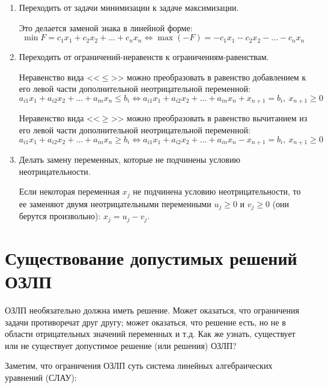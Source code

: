 \documentclass[a4paper,12pt]{report}
\begin{document}
\begin{enumerate}
\item Переходить от задачи минимизации к задаче максимизации. 

Это делается заменой знака в линейной форме:
\begin{equation*}
\min F = c_{1}x_{1} + c_{2}x_{2} + \ldots + c_{n}x_{n} \Leftrightarrow \max (-F) = -c_{1}x_{1} - c_{2}x_{2} - \ldots - c_{n}x_{n}
\end{equation*}

\item Переходить от ограничений-неравенств к ограничениям-равенствам. 

Неравенство вида <<$\leq$>> можно преобразовать в равенство добавлением к его левой части дополнительной неотрицательной переменной:
\begin{equation*}
a_{i1}x_{1} + a_{i2}x_{2} + \ldots + a_{in}x_{n} \leq b_{i} \Leftrightarrow a_{i1}x_{1} + a_{i2}x_{2} + \ldots + a_{in}x_{n} + x_{n+1} = b_{i},\ x_{n+1} \geq 0
\end{equation*}

Неравенство вида <<$\geq$>> можно преобразовать в равенство вычитанием из его левой части дополнительной неотрицательной переменной:
\begin{equation*}
a_{i1}x_{1} + a_{i2}x_{2} + \ldots + a_{in}x_{n} \geq b_{i} \Leftrightarrow a_{i1}x_{1} + a_{i2}x_{2} + \ldots + a_{in}x_{n} - x_{n+1} = b_{i},\ x_{n+1} \geq 0
\end{equation*}

\item Делать замену переменных, которые не подчинены условию неотрицательности.

Если некоторая переменная $x_{j}$ не подчинена условию неотрицательности, то ее заменяют двумя неотрицательными переменными $u_{j} \geq 0$ и $v_{j} \geq 0$ (они берутся произвольно): $x_{j} = u_{j} - v_{j}$.
\end{enumerate}

\section{Существование допустимых решений ОЗЛП}
ОЗЛП необязательно должна иметь решение. Может оказаться, что ограничения задачи противоречат друг другу; может оказаться, что решение есть, но не в области отрицательных значений переменных и т.д. Как же узнать, существует или не существует допустимое решение (или решения) ОЗЛП?

Заметим, что ограничения ОЗЛП суть система линейных алгебраических уравнений (СЛАУ):
\end{document}
